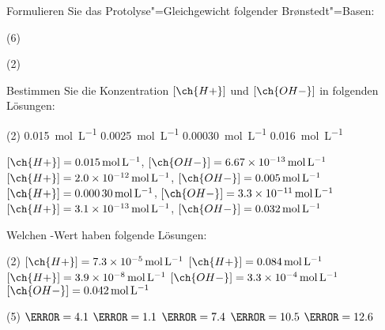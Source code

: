 \documentclass{scrartcl}
\begin{document}
\begin{question}
  Formulieren Sie das Protolyse"=Gleichgewicht folgender Br\o nstedt"=Basen:
  \begin{tasks}(6)
    \task {}
    \task {}
    \task {}
    \task {}
    \task {}
    \task {}
  \end{tasks}
\end{question}
\begin{solution}
  \begin{tasks}(2)
    \task {}
    \task {}
    \task {}
    \task {}
    \task {}
    \task {}
  \end{tasks}
\end{solution}

\begin{question}
  Bestimmen Sie die Konzentration \([\ch{H+}]\) und \([\ch{OH-}]\) in folgenden
  Lösungen:
  \begin{tasks}(2)
    \task \SI{.015}{\mole\per\liter} 
    \task \SI{.0025}{\mole\per\liter} 
    \task \SI{.00030}{\mole\per\liter} 
    \task \SI{.016}{\mole\per\liter} 
  \end{tasks}
\end{question}
\begin{solution}
  \begin{tasks}
    \task $[\ch{H+}] = \SI{.015}{\mole\per\liter}$, $[\ch{OH-}] =
      \SI{6.67e-13}{\mole\per\liter}$
    \task $[\ch{H+}] = \SI{2.0e-12}{\mole\per\liter}$, $[\ch{OH-}] =
      \SI{.005}{\mole\per\liter}$
    \task $[\ch{H+}] = \SI{.00030}{\mole\per\liter}$, $[\ch{OH-}] =
      \SI{3.3e-11}{\mole\per\liter}$
    \task $[\ch{H+}] = \SI{3.1e-13}{\mole\per\liter}$, $[\ch{OH-}] =
      \SI{.032}{\mole\per\liter}$
  \end{tasks}
\end{solution}

\begin{question}
  Welchen \pH-Wert haben folgende Lösungen:
  \begin{tasks}(2)
    \task \([\ch{H+}] = \SI{7.3e-5}{\mole\per\liter}\)
    \task \([\ch{H+}] = \SI{.084}{\mole\per\liter}\)
    \task \([\ch{H+}] = \SI{3.9e-8}{\mole\per\liter}\)
    \task \([\ch{OH-}] = \SI{3.3e-4}{\mole\per\liter}\)
    \task \([\ch{OH-}] = \SI{.042}{\mole\per\liter}\)
  \end{tasks}
\end{question}
\begin{solution}
  \begin{tasks}(5)
    \task $\pH = 4.1$
    \task $\pH = 1.1$
    \task $\pH = 7.4$
    \task $\pH = 10.5$
    \task $\pH = 12.6$
  \end{tasks}
\end{solution}
\end{document}
